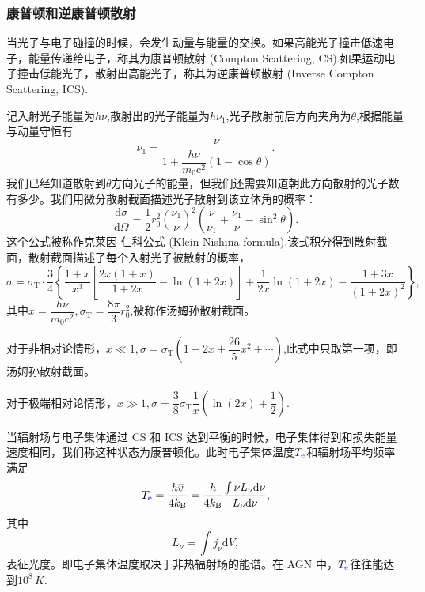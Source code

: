 \documentclass[../天体物理基础.tex]{subfiles}
\begin{document}
\subsubsection{康普顿和逆康普顿散射}
当光子与电子碰撞的时候，会发生动量与能量的交换。如果高能光子撞击低速电子，能量传递给电子，称其为康普顿散射 (Compton Scattering, CS).如果运动电子撞击低能光子，散射出高能光子，称其为逆康普顿散射 (Inverse Compton Scattering, ICS).

记入射光子能量为$h\nu$,散射出的光子能量为$h\nu_{1}$,光子散射前后方向夹角为$\theta$,根据能量与动量守恒有
\begin{equation}
\nu_{1}=\frac{\nu}{1+\dfrac{h\nu}{m_{0}\mathrm{c}^{2}}\left(1-\cos\theta\right)}.
\end{equation}
我们已经知道散射到$\theta$方向光子的能量，但我们还需要知道朝此方向散射的光子数有多少。我们用微分散射截面描述光子散射到该立体角的概率：
\begin{equation}
\frac{\mathrm{d}\sigma}{\mathrm{d}\Omega}=\frac{1}{2}r_{0}^{2}\left(\frac{\nu_{1}}{\nu}\right)^{2}\left(\frac{\nu}{\nu_{1}}+\frac{\nu_{1}}{\nu}-\sin^{2}\theta\right).
\end{equation}
这个公式被称作克莱因{}-{}仁科公式 (Klein-Nishina formula).该式积分得到散射截面，散射截面描述了每个入射光子被散射的概率，
\begin{equation}
\sigma=\sigma_{\text{T}}\cdot\frac34\left\{\frac{1+x}{x^{3}}\left[\frac{2x\left(1+x\right)}{1+2x}-\ln\left(1+2x\right)\right]+\frac1{2x}\ln\left(1+2x\right)-\frac{1+3x}{\left(1+2x\right)^{2}}\right\},
\end{equation}
其中$x=\dfrac{h\nu}{m_{0}\mathrm{c}^{2}},\sigma_{\text{T}}=\dfrac{8\pi}{3}r_{0}^{2}$,被称作汤姆孙散射截面。

对于非相对论情形，$x\ll1,\sigma=\sigma_{\text{T}}\left(1-2x+\dfrac{26}{5}x^{2}+\cdots\right)$,此式中只取第一项，即汤姆孙散射截面。

对于极端相对论情形，$x\gg1,\sigma=\dfrac{3}{8}\sigma_{\text{T}}\dfrac{1}{x}\left(\ln\left(2x\right)+\dfrac{1}{2}\right)$.

当辐射场与电子集体通过 CS 和 ICS 达到平衡的时候，电子集体得到和损失能量速度相同，我们称这种状态为康普顿化。此时电子集体温度$T_{{\color{blue}{\ce{e}}}}$和辐射场平均频率满足
\begin{equation}
T_{{\color{blue}{\ce{e}}}}=\frac{h\overline{v}}{4k_{\text{B}}}=\frac{h}{4k_{\text{B}}}\frac{\int\nu L_{\nu}\mathrm{d}\nu}{L_{\nu}\mathrm{d}\nu},
\end{equation}
其中
\begin{equation}
L_{\nu}=\int j_{\nu}\mathrm{d}V,
\end{equation}
表征光度。即电子集体温度取决于非热辐射场的能谱。在 AGN 中，$T_{{\color{blue}{\ce{e}}}}$往往能达到$10^{8}\,\unit{K}$.
\end{document}
